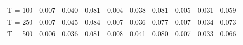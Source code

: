 % 
\begin{tabular}{cccccccccc}
  \hline
  \hline
T = 100 & 0.007 & 0.040 & 0.081 & 0.004 & 0.038 & 0.081 & 0.005 & 0.031 & 0.059 \\ 
  T = 250 & 0.007 & 0.045 & 0.084 & 0.007 & 0.036 & 0.077 & 0.007 & 0.034 & 0.073 \\ 
  T = 500 & 0.006 & 0.036 & 0.081 & 0.008 & 0.041 & 0.080 & 0.007 & 0.033 & 0.066 \\ 
   \hline
\end{tabular}
